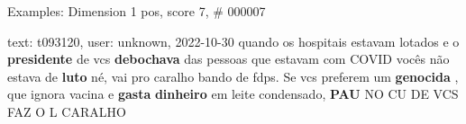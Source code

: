 \begin{frame}{Examples: Dimension 1 pos, score 7, \# 000007}
\footnotesize
\begin{exampleblock}{text: t093120, user: unknown, 2022-10-30}
quando os hospitais estavam lotados e o \textbf{presidente} de vcs 
\textbf{debochava} das pessoas que estavam com COVID vocês não estava de 
\textbf{luto} né, vai pro caralho bando de fdps. Se vcs preferem um 
\textbf{genocida} , que ignora vacina e \textbf{gasta} \textbf{dinheiro} em 
leite condensado, \textbf{PAU} NO CU DE VCS FAZ O L CARALHO 
\end{exampleblock}
\end{frame}
